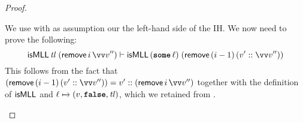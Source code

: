 \documentclass[thesis.tex]{subfiles}
\begin{document}
\begin{proof}
\begin{description}
\begin{description}
\[          \]
          We use  with as assumption our the left-hand side of the IH. We now need to prove the following:
          \[\isMLL\, \tl\; (\textlog{remove}\, \iindex\, \vect{\val}'') \proves \isMLL\, (\Some \loc)\; (\textlog{remove}\, (\iindex - 1)\, (\val' :: \vect{\val}''))\]
          This follows from the fact that $(\textlog{remove}\, (\iindex - 1)\, (\val' :: \vect{\val}'')) = \val' :: (\textlog{remove}\, \iindex\, \vect{\val}'')$ together with the definition of $\textsf{\upshape isMLL}$ and $\loc \fmapsto (\val, \False, \tl)$, which we retained from . \qedhere
      \end{description}
  \end{description}
\end{proof}
\end{document}
